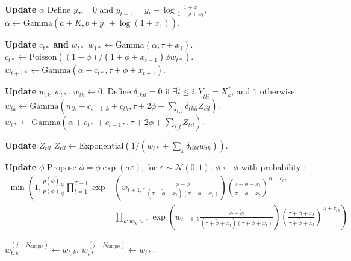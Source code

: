 \documentclass{article}
\begin{document}
\begin{algorithm}
\begin{algorithmic}
\STATE

\STATE \textbf{Update }$\alpha$
\STATE Define $y_T=0$ and $y_{t-1}=y_t-\log \frac{1+\phi}{1+\phi+x_t}$.
\STATE $\alpha\leftarrow\text{Gamma}(a+K,b+y_1+\log(1+x_1))$.

\STATE

\STATE \textbf{Update }$c_{t*}$ \textbf{and} $w_{t*}$
\STATE $w_{1*}\leftarrow\text{Gamma}(\alpha,\tau+x_1)$.
\STATE $c_{t*}\leftarrow\text{Poisson}((1+\phi)/(1+\phi+x_{t+1})\phi w_{t*})$.
\STATE $w_{t+1*}\leftarrow\text{Gamma}(\alpha+c_{t*},\tau+\phi+x_{t+1})$.
\ENDFOR

\STATE
\STATE
\STATE
\STATE
\STATE
\STATE
\STATE
\STATE
\STATE
\ENDFOR
\end{algorithmic}
\end{algorithm}

\begin{algorithm}
\begin{algorithmic}

\STATE \textbf{Update }$w_{tk},w_{t*}$.
\STATE $w_{tk}\leftarrow 0$.
\ELSE
\STATE Define $\delta_{tkil}=0$ if $\exists \hat{i}\leqslant i, Y_{tl\hat{i}}=X^*_k$, and $1$ otherwise.
\STATE $w_{tk}\leftarrow\text{Gamma}(n_{tk}+c_{t-1,k}+c_{tk},\tau+2\phi+\sum_{i,l}\delta_{tkil}Z_{til})$.
\ENDIF
\ENDFOR
\STATE $w_{t*}\leftarrow\text{Gamma}(\alpha+c_{t*}+c_{t-1*},\tau+2\phi+\sum_{i,l}Z_{til})$.
\ENDFOR

\STATE

\STATE \textbf{Update }$Z_{til}$
\STATE $Z_{til}\leftarrow\text{Exponential}(1/(w_{t*}+\sum_{k}\delta_{tikl}w_{tk}))$.

\STATE

\STATE \textbf{Update }$\phi$
\STATE Propose $\tilde{\phi}=\phi\exp(\sigma\varepsilon)$, for $\varepsilon\sim\mathcal{N}(0,1)$.
\STATE $\phi\leftarrow\tilde{\phi}$ with probability :
{\small
\begin{align*}
\min \left( 1 , \frac{p(\tilde{\phi})}{p(\phi)}\frac{\phi}{\tilde{\phi}}\prod_{t=1}^{T-1} \exp\right. & \left( w_{t+1,*}\frac{\phi-\tilde{\phi}}{(\tau+\tilde{\phi}+x_t)(\tau+\phi+x_t)}\right)\left(\frac{\tau+\phi+x_t}{\tau+\tilde{\phi}+x_t}\right)^{\alpha+c_{t*}} \\
& \left. \prod_{k:w_{tk}>0} \exp\left( w_{t+1,k}\frac{\phi-\tilde{\phi}}{(\tau+\tilde{\phi}+x_t)(\tau+\phi+x_t)}\right)\left(\frac{\tau+\phi+x_t}{\tau+\tilde{\phi}+x_t}\right)^{\alpha+c_{tk}} \right)
\end{align*}}

\STATE

\STATE $w_{t,k}^{(j-N_\text{sample})}\leftarrow w_{t,k}$.
\STATE $w_{t*}^{(j-N_\text{sample})}\leftarrow w_{t*}$.
\ENDIF
\ENDFOR

\end{algorithmic}
\end{algorithm}
\newpage
\end{document}
